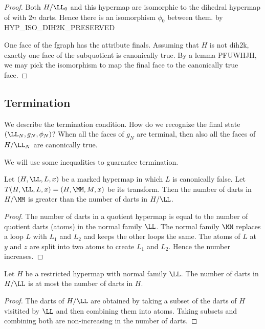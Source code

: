 \begin{lemma}
\begin{lemma}
\begin{proof}
Both $H/\LL_0$ and this hypermap are isomorphic
to the dihedral hypermap of with $2n$ darts.
Hence there is an isomorphism $\phi_0$ between them.
by HYP\_ISO\_DIH2K\_PRESERVED


One face of the fgraph has the attribute finals.  Assuming that $H$ is
not dih2k, exactly one face of the subquotient is canonically true.
By a lemma PFUWHJH, 
we may pick the isomorphism to map the final face
to the canonically true face.
\end{proof}


\subsection{Termination}


We describe the termination condition.  How do we recognize
the final state $(\LL_N,g_N,\phi_N)$?  When all the faces
of $g_N$ are terminal, then also all the faces of $H/\LL_N$ are
canonically true.  

We will use some inequalities to guarantee termination.

\begin{lemma}  
  Let $(H,\LL,L,x)$ be a marked hypermap in which $L$ is canonically
  false.  Let $T(H,\LL,L,x) = (H,\MM,M,x)$ be its transform.  Then the
  number of darts in $H/\MM$ is greater than the number of darts in
  $H/\LL$.
\end{lemma} 

\begin{proof}  The number of darts in a quotient hypermap is equal
to the number of quotient darts (atoms) in the normal family $\LL$.
The normal family $\MM$ replaces a loop $L$ with $L_1$ and $L_2$
and keeps the other loops the same.  The atoms of $L$ at
$y$ and $z$ are split into two atoms to create $L_1$ and $L_2$.
Hence the number increases.
\end{proof}

\begin{lemma}
 Let $H$ be a restricted hypermap with normal family
$\LL$.  The number of darts in $H/\LL$ is at most the number of
darts in $H$.  
\end{lemma} 

\begin{proof} The darts of $H/\LL$ are obtained by taking a subset
of the darts of $H$ visitited by $\LL$ and then combining them into
atoms.  Taking subsets and combining both are non-increasing
in the number of darts.  
\end{proof}


\end{lemma}
\end{lemma}
